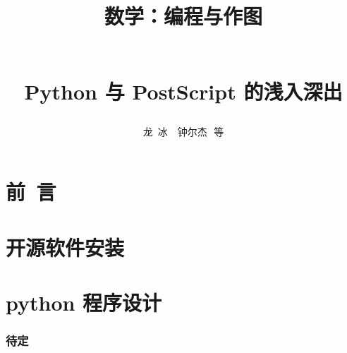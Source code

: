 \documentclass[zihao=-4,linespread=1.5,heading=true,a4paper,twoside]{ctexart}
\title{\begin{kaishu}数学：编程与作图\end{kaishu}\\
	Python 与 PostScript 的浅入深出}
\author{\kaishu 龙\,  冰\, \, 钟尔杰\,\,  等}
\begin{document}
\begin{titlepage}
	\maketitle
\end{titlepage}

\part*{\kaishu 前\, 言}\label{sec:preface}


\newpage\tableofcontents

\newpage\part{开源软件安装}


\newpage\part{python 程序设计}
\section{待定}\label{sec:II.1}


%

%

%

%
\end{document}
